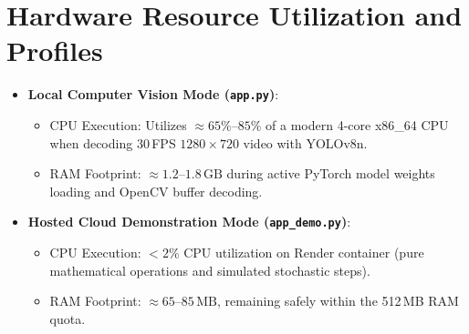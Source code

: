 \section{Hardware Resource Utilization and Profiles}
\begin{itemize}[leftmargin=*]
    \item \textbf{Local Computer Vision Mode (\texttt{app.py})}:
    \begin{itemize}
        \item CPU Execution: Utilizes $\approx 65\%\text{--}85\%$ of a modern 4-core x86\_64 CPU when decoding 30\,FPS $1280 \times 720$ video with YOLOv8n.
        \item RAM Footprint: $\approx 1.2\text{--}1.8\,\text{GB}$ during active PyTorch model weights loading and OpenCV buffer decoding.
    \end{itemize}
    \item \textbf{Hosted Cloud Demonstration Mode (\texttt{app\_demo.py})}:
    \begin{itemize}
        \item CPU Execution: $< 2\%$ CPU utilization on Render container (pure mathematical operations and simulated stochastic steps).
        \item RAM Footprint: $\approx 65\text{--}85\,\text{MB}$, remaining safely within the 512\,MB RAM quota.
    \end{itemize}
\end{itemize}
